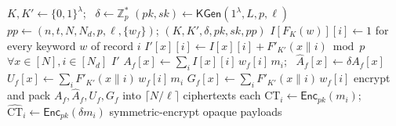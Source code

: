 \documentclass[journal]{IEEEtran}
\newcommand{\Enc}{\mathsf{Enc}}
\begin{document}
\begin{algorithm}[t]
\caption{Outsourcing: $\mathsf{Setup}$, $\mathsf{BuildIndex}$, $\mathsf{Precompute}$, $\mathsf{EncData}$}
\label{alg:outsource}
\begin{algorithmic}[1]
  \State $K,K'\gets\{0,1\}^\lambda$; \ $\delta\gets\mathbb{Z}_p^{*}$
  \State $(pk,sk)\gets\mathsf{KGen}(1^\lambda,L,p,\ell)$
  \State $pp\gets(n,t,N,N_d,p,\ell,\{w_f\})$; \Return $(K,K',\delta,pk,sk,pp)$
\EndProcedure
{}
  \State $I[F_K(w)][i]\gets 1$ for every keyword $w$ of record $i$
  \State $I'[x][i]\gets I[x][i]+F'_{K'}(x\|i) \bmod p$ \ \ $\forall x\in[N],i\in[N_d]$
  \State \Return $I'$ 
\EndProcedure
{}
    \State $A_f[x]\gets\sum_i I[x][i]\,w_f[i]\,m_i$; \ $\widehat{A}_f[x]\gets\delta A_f[x]$
    \State $U_f[x]\gets\sum_i F'_{K'}(x\|i)\,w_f[i]\,m_i$
    \State $G_f[x]\gets\sum_i F'_{K'}(x\|i)\,w_f[i]$ 
    \State encrypt and pack $A_f,\widehat{A}_f,U_f,G_f$ into $\lceil N/\ell\rceil$ ciphertexts each
  \EndFor
\EndProcedure
{}
  \State $\text{CT}_i\gets\Enc_{pk}(m_i)$; \ $\widehat{\text{CT}}_i\gets\Enc_{pk}(\delta m_i)$
  \State symmetric-encrypt opaque payloads
\EndProcedure
\end{algorithmic}
\end{algorithm}
\end{document}
